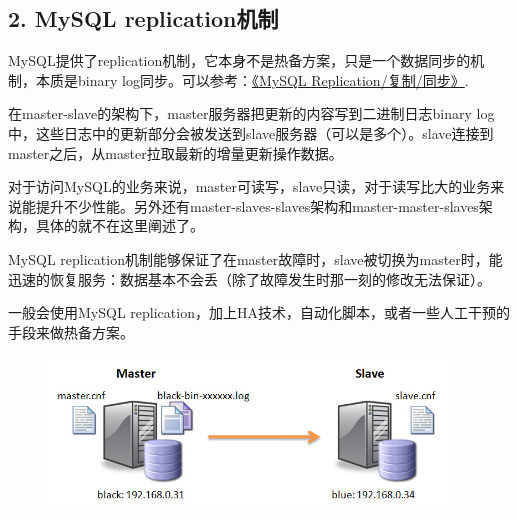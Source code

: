 {    \subsection* {2. MySQL replication机制}{
        {MySQL提供了replication机制，它本身不是热备方案，只是一个数据同步的机制，本质是binary log同步。可以参考：\href{http://dp.imysql.com:8080/taxonomy/term/23}{《MySQL Replication/复制/同步》}.}\par
        {在master-slave的架构下，master服务器把更新的内容写到二进制日志binary log中，这些日志中的更新部分会被发送到slave服务器（可以是多个）。slave连接到master之后，从master拉取最新的增量更新操作数据。}\par
        {对于访问MySQL的业务来说，master可读写，slave只读，对于读写比大的业务来说能提升不少性能。另外还有master-slaves-slaves架构和master-master-slaves架构，具体的就不在这里阐述了。}\par
        {MySQL replication机制能够保证了在master故障时，slave被切换为master时，能迅速的恢复服务：数据基本不会丢（除了故障发生时那一刻的修改无法保证）。}\par
        {一般会使用MySQL replication，加上HA技术，自动化脚本，或者一些人工干预的手段来做热备方案。}\par
        \begin {figure}[htbp]
            \centering
            \includegraphics [width=300pt, keepaspectratio] {mysql_master_slave.jpg}
        \end {figure}
    }

}
